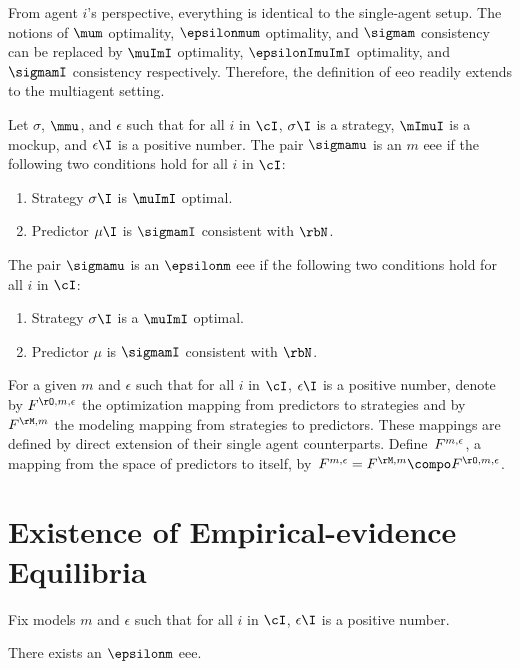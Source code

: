 From agent \(i\)'s perspective, everything is identical to the single-agent setup.
The notions of \(\mum\) optimality, \(\epsilonmum\) optimality, and \(\sigmam\) consistency can be replaced by \(\muImI\) optimality, \(\epsilonImuImI\) optimality, and \(\sigmamI\) consistency respectively.
Therefore, the definition of \ac{eeo} readily extends to the multiagent setting.
\begin{definition}
Let \(\sigma\), \(\mmu\), and \(\epsilon\) such that for all \(i\) in \(\cI\), \(\sigma\I\) is a strategy, \(\mImuI\) is a mockup, and \(\epsilon\I\) is a positive number.
The pair \(\sigmamu\) is an \(m\) \ac{eee} if the following two conditions hold for all \(i\) in \(\cI\):
\begin{enumerate}
\item Strategy \(\sigma\I\) is \(\muImI\) optimal.
\item Predictor \(\mu\I\) is \(\sigmamI\) consistent with \(\rbN\).
\end{enumerate}
The pair \(\sigmamu\) is an \(\epsilonm\) \ac{eee} if the following two conditions hold for all \(i\) in \(\cI\):
\begin{enumerate}
\item Strategy \(\sigma\I\) is a \(\muImI\) optimal.
\item Predictor \(\mu\) is \(\sigmamI\) consistent with \(\rbN\).
\end{enumerate}
\end{definition}

For a given \(m\) and \(\epsilon\) such that for all \(i\) in \(\cI\), \(\epsilon\I\) is a positive number, denote by \(\FO\) the optimization mapping from predictors to strategies and by \(\FM\) the modeling mapping from strategies to  predictors.
These mappings are defined by direct extension of their single agent counterparts.
Define~\(F^{m, \epsilon}\), a mapping from the space of predictors to itself, by~\(\FF = \FM \compo \FO\).

\section{Existence of Empirical-evidence Equilibria}


Fix models \(m\) and \(\epsilon\) such that for all \(i\) in \(\cI\), \(\epsilon\I\) is a positive number.

\begin{theorem}
\label{res:mme_existence}
There exists an \(\epsilonm\) \ac{eee}.
\end{theorem}

